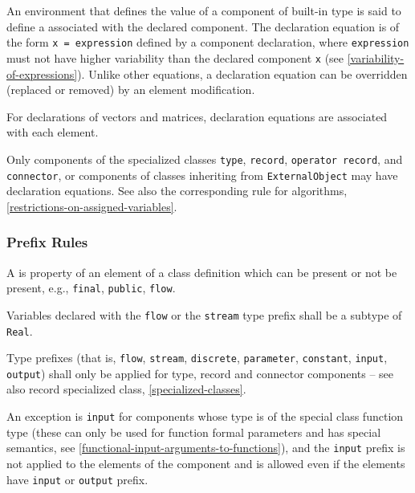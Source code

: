 An environment that defines the value of a component of built-in type is said to define a  associated with the declared component.
The declaration equation is of the form \lstinline!x = expression! defined by a component declaration, where \lstinline!expression! must not have higher variability than the declared component \lstinline!x! (see \cref{variability-of-expressions}).
Unlike other equations, a declaration equation can be overridden (replaced or removed) by an element modification.

For declarations of vectors and matrices, declaration equations are associated with each element.

Only components of the specialized classes \lstinline!type!, \lstinline!record!, \lstinline!operator record!, and \lstinline!connector!, or components of classes inheriting from \lstinline!ExternalObject! may have declaration equations.
See also the corresponding rule for algorithms, \cref{restrictions-on-assigned-variables}.

\subsubsection{Prefix Rules}\label{prefix-rules}

A  is property of an element of a class definition which can be present or not be present, e.g., \lstinline!final!, \lstinline!public!, \lstinline!flow!.

Variables declared with the \lstinline!flow! or the \lstinline!stream! type prefix shall be a subtype of \lstinline!Real!.

Type prefixes (that is, \lstinline!flow!, \lstinline!stream!, \lstinline!discrete!, \lstinline!parameter!, \lstinline!constant!, \lstinline!input!, \lstinline!output!) shall only be applied for type,
record and connector components -- see also record specialized class, \cref{specialized-classes}.

An exception is \lstinline!input! for components whose type is of the special class function type (these can only be used for function formal parameters and has special semantics, see \cref{functional-input-arguments-to-functions}), and the \lstinline!input! prefix is not applied to the elements of the component and is allowed even if the elements have \lstinline!input! or \lstinline!output! prefix.

